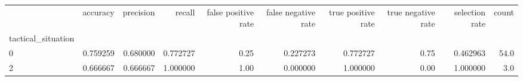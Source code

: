 \begin{tabular}{lrrrrrrrrr}
\toprule
{} &  accuracy &  precision &    recall &  false positive rate &  false negative rate &  true positive rate &  true negative rate &  selection rate &  count \\
tactical\_situation &           &            &           &                      &                      &                     &                     &                 &        \\
\midrule
0                  &  0.759259 &   0.680000 &  0.772727 &                 0.25 &             0.227273 &            0.772727 &                0.75 &        0.462963 &   54.0 \\
2                  &  0.666667 &   0.666667 &  1.000000 &                 1.00 &             0.000000 &            1.000000 &                0.00 &        1.000000 &    3.0 \\
\bottomrule
\end{tabular}
